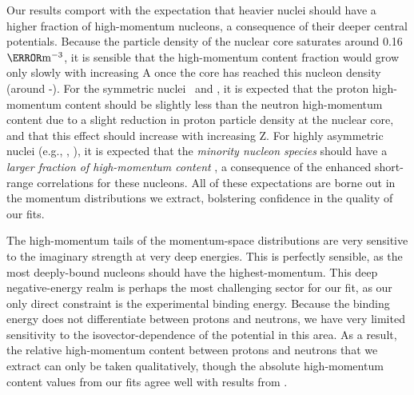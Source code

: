 Our results comport with the expectation that heavier nuclei should have a
higher fraction of high-momentum nucleons, a consequence of their deeper central
potentials. Because the particle density of the nuclear core saturates around
0.16 $\femto\meter^{-3}$, it is sensible that the
high-momentum content fraction would grow only slowly with increasing A once
the core has reached this nucleon density (around \cTwelve-\oSix).
For the symmetric nuclei \oSix\ and \caForty, it is expected that the proton
high-momentum content should be slightly less than the neutron high-momentum
content due to a slight reduction in proton particle density at the nuclear
core, and that this effect should increase with increasing Z. For highly asymmetric
nuclei (e.g., \snFour, \pbEight), it is expected that the \textit{minority
nucleon species} should have a \textit{larger fraction of high-momentum
content} \cite{Subedi2008, Hen2012}, a consequence of the enhanced
short-range correlations for these nucleons. All of these expectations are borne
out in the momentum distributions we extract, bolstering confidence in the
quality of our fits.

The high-momentum tails of the
momentum-space distributions are very sensitive to the imaginary
strength at very deep energies. This is perfectly sensible, as the most deeply-bound
nucleons should have the highest-momentum. This deep
negative-energy realm is perhaps the most challenging sector for our fit,
as our only direct constraint is the experimental binding energy. Because the
binding energy does not differentiate between protons and neutrons, we have
very limited sensitivity to the isovector-dependence of the potential in
this area. As a result, the relative high-momentum content between protons and
neutrons that we extract can only be taken qualitatively, though the absolute
high-momentum content values from our fits agree well with results from
\cite{Rohe2004, RoheHabilitation}.

